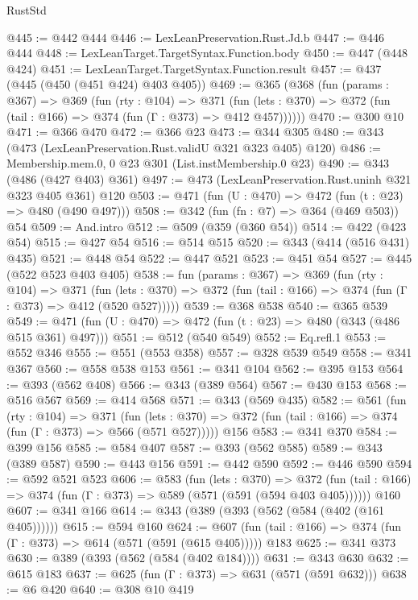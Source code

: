 \begin{lexlean}{RustStd}
\begin{coremodule}
@445 := @442 @444
@446 := LexLeanPreservation.Rust.Jd.b
@447 := @446 @444
@448 := LexLeanTarget.TargetSyntax.Function.body
@450 := @447 (@448 @424)
@451 := LexLeanTarget.TargetSyntax.Function.result
@457 := @437 (@445 (@450 (@451 @424) @403 @405))
@469 := @365
    (@368
      (fun (params : @367) =>
      @369
        (fun (rty : @104) =>
        @371
          (fun (lets : @370) => @372 (fun (tail : @166) => @374 (fun (Γ : @373) => @412 @457))))))
@470 := @300 @10
@471 := @366 @470
@472 := @366 @23
@473 := @344 @305
@480 := @343 (@473 (LexLeanPreservation.Rust.validU @321 @323 @405) @120)
@486 := Membership.mem.{0, 0} @23 @301 (List.instMembership.{0} @23)
@490 := @343 (@486 (@427 @403) @361)
@497 := @473 (LexLeanPreservation.Rust.uninh @321 @323 @405 @361) @120
@503 := @471 (fun (U : @470) => @472 (fun (t : @23) => @480 (@490 @497)))
@508 := @342 (fun (fn : @7) => @364 (@469 @503)) @54
@509 := And.intro
@512 := @509 (@359 (@360 @54))
@514 := @422 (@423 @54)
@515 := @427 @54
@516 := @514 @515
@520 := @343 (@414 (@516 @431) @435)
@521 := @448 @54
@522 := @447 @521
@523 := @451 @54
@527 := @445 (@522 @523 @403 @405)
@538 := fun (params : @367) =>
  @369
    (fun (rty : @104) =>
    @371
      (fun (lets : @370) => @372 (fun (tail : @166) => @374 (fun (Γ : @373) => @412 (@520 @527)))))
@539 := @368 @538
@540 := @365 @539
@549 := @471 (fun (U : @470) => @472 (fun (t : @23) => @480 (@343 (@486 @515 @361) @497)))
@551 := @512 (@540 @549)
@552 := Eq.refl.{1}
@553 := @552 @346
@555 := @551 (@553 @358)
@557 := @328 @539 @549
@558 := @341 @367
@560 := @558 @538 @153
@561 := @341 @104
@562 := @395 @153
@564 := @393 (@562 @408)
@566 := @343 (@389 @564)
@567 := @430 @153
@568 := @516 @567
@569 := @414 @568
@571 := @343 (@569 @435)
@582 := @561
    (fun (rty : @104) =>
    @371
      (fun (lets : @370) => @372 (fun (tail : @166) => @374 (fun (Γ : @373) => @566 (@571 @527)))))
    @156
@583 := @341 @370
@584 := @399 @156
@585 := @584 @407
@587 := @393 (@562 @585)
@589 := @343 (@389 @587)
@590 := @443 @156
@591 := @442 @590
@592 := @446 @590
@594 := @592 @521 @523
@606 := @583
    (fun (lets : @370) =>
    @372 (fun (tail : @166) => @374 (fun (Γ : @373) => @589 (@571 (@591 (@594 @403 @405))))))
    @160
@607 := @341 @166
@614 := @343 (@389 (@393 (@562 (@584 (@402 (@161 @405))))))
@615 := @594 @160
@624 := @607 (fun (tail : @166) => @374 (fun (Γ : @373) => @614 (@571 (@591 (@615 @405))))) @183
@625 := @341 @373
@630 := @389 (@393 (@562 (@584 (@402 @184))))
@631 := @343 @630
@632 := @615 @183
@637 := @625 (fun (Γ : @373) => @631 (@571 (@591 @632)))
@638 := @6 @420
@640 := @308 @10 @419

\end{coremodule}
\end{lexlean}
